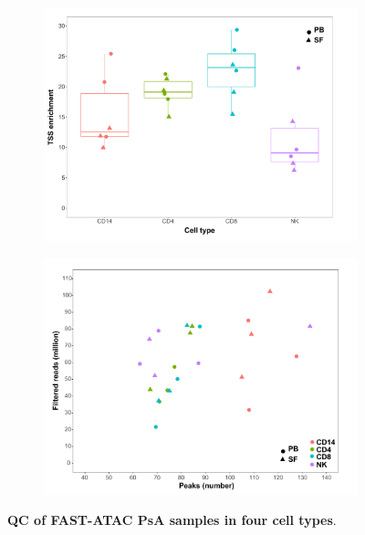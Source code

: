 \begin{figure}[H]
\begin{subfigure}[b]{0.48\textwidth}
\includegraphics[width=\textwidth]{./Results3/pdfs/ATAC_PSA_all_TSS_max_per_cell_type}%
\caption{}
\end{subfigure}
\begin{subfigure}[b]{0.48\textwidth} 
\centering
\includegraphics[width=\textwidth]{./Results3/pdfs/ATAC_PSA_all_peaks_vs_num_reads}%
\caption{}
\end{subfigure}
\caption[QC of FAST-ATAC PsA samples in four cell types]{\textbf{QC of FAST-ATAC PsA samples in four cell types}. }
\label{figure:PsA_FAST_ATAC_QC}
\end{figure}

